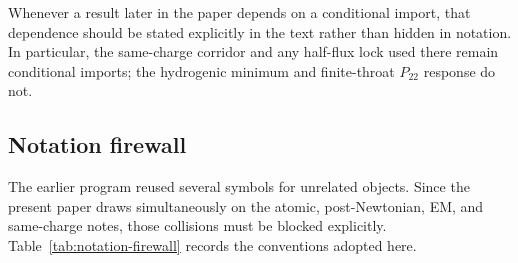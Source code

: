 \documentclass[11pt]{article}
\theoremstyle{plain}
\theoremstyle{definition}
\theoremstyle{remark}
\newcommand{\Ptwotwo}{P_{22}}
\begin{document}
Whenever a result later in the paper depends on a conditional import, that dependence should be stated explicitly in the text rather than hidden in notation. In particular, the same-charge corridor and any half-flux lock used there remain conditional imports; the hydrogenic minimum and finite-throat $\Ptwotwo$ response do not.

\subsection{Notation firewall}\label{subsec:notation-firewall}

The earlier program reused several symbols for unrelated objects. Since the present paper draws simultaneously on the atomic, post-Newtonian, EM, and same-charge notes, those collisions must be blocked explicitly. Table~\ref{tab:notation-firewall} records the conventions adopted here.
\end{document}
